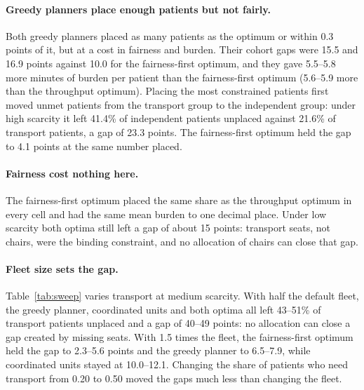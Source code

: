 \documentclass[11pt,a4paper]{article}
\begin{document}
\paragraph{Greedy planners place enough patients but not fairly.} Both greedy planners placed as many patients
as the optimum or within 0.3 points of it, but at a cost in fairness and burden. Their cohort gaps were 15.5
and 16.9 points against 10.0 for the fairness-first optimum, and they gave 5.5--5.8 more minutes of burden
per patient than the fairness-first optimum (5.6--5.9 more than the throughput optimum). Placing the most constrained patients first moved unmet patients from the transport group to the
independent group: under high scarcity it left 41.4\% of independent patients unplaced against 21.6\% of
transport patients, a gap of 23.3 points. The fairness-first optimum held the gap to 4.1 points at the same
number placed.

\paragraph{Fairness cost nothing here.} The fairness-first optimum placed the same share as the throughput
optimum in every cell and had the same mean burden to one decimal place. Under low scarcity both optima still
left a gap of about 15 points: transport seats, not chairs, were the binding constraint, and no allocation of
chairs can close that gap.

\paragraph{Fleet size sets the gap.} Table~\ref{tab:sweep} varies transport at medium scarcity. With half the
default fleet, the greedy planner, coordinated units and both optima all left 43--51\% of transport patients
unplaced and a gap of 40--49 points: no allocation can close a gap created by missing seats. With 1.5 times the fleet, the
fairness-first optimum held the gap to 2.3--5.6 points and the greedy planner to 6.5--7.9, while coordinated
units stayed at 10.0--12.1. Changing the share of patients who need transport from 0.20 to 0.50 moved the gaps
much less than changing the fleet.
\end{document}
